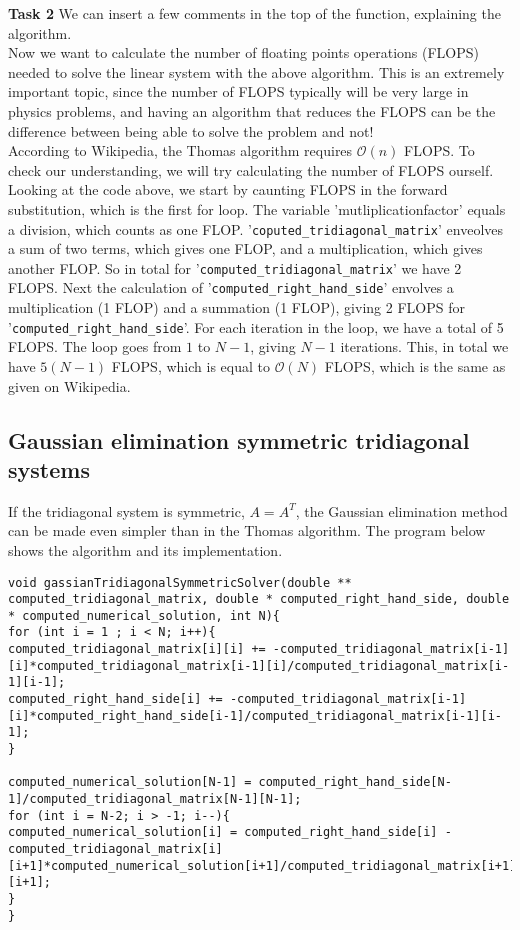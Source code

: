 \documentclass{article}
\begin{document}
\textbf{Task 2} We can insert a few comments in the top of the function, explaining the algorithm. \\

Now we want to calculate the number of floating points operations (FLOPS) needed to solve the linear system with the above algorithm. This is an extremely important topic, since the number of FLOPS typically will be very large in physics problems, and having an algorithm that reduces the FLOPS can be the difference between being able to solve the problem and not!\\

According to Wikipedia, the Thomas algorithm requires $\mathcal{O}(n)$ FLOPS. To check our understanding, we will try calculating the number of FLOPS ourself. Looking at the code above, we start by caunting FLOPS in the forward substitution, which is the first for loop. The variable 'mutliplicationfactor' equals a division, which counts as one FLOP. '\texttt{coputed\_tridiagonal\_matrix}' enveolves a sum of two terms, which gives one FLOP, and a multiplication, which gives another FLOP. So in total for '\texttt{computed\_tridiagonal\_matrix}' we have 2 FLOPS. Next the calculation of '\texttt{computed\_right\_hand\_side}' envolves a multiplication (1 FLOP) and a summation (1 FLOP), giving 2 FLOPS for '\texttt{computed\_right\_hand\_side}'. For each iteration in the loop, we have a total of 5 FLOPS. The loop goes from $1$ to $N-1$, giving $N-1$ iterations. This, in total we have $5(N-1)$ FLOPS, which is equal to $\mathcal{O}(N)$ FLOPS, which is the same as given on Wikipedia.

\subsection{Gaussian elimination symmetric tridiagonal systems}
If the tridiagonal system is symmetric, $A = A^T$, the Gaussian elimination method can be made even simpler than in the Thomas algorithm. The program below shows the algorithm and its implementation.

\begin{lstlisting}
void gassianTridiagonalSymmetricSolver(double ** computed_tridiagonal_matrix, double * computed_right_hand_side, double * computed_numerical_solution, int N){
for (int i = 1 ; i < N; i++){
computed_tridiagonal_matrix[i][i] += -computed_tridiagonal_matrix[i-1][i]*computed_tridiagonal_matrix[i-1][i]/computed_tridiagonal_matrix[i-1][i-1];
computed_right_hand_side[i] += -computed_tridiagonal_matrix[i-1][i]*computed_right_hand_side[i-1]/computed_tridiagonal_matrix[i-1][i-1];
}

computed_numerical_solution[N-1] = computed_right_hand_side[N-1]/computed_tridiagonal_matrix[N-1][N-1];
for (int i = N-2; i > -1; i--){
computed_numerical_solution[i] = computed_right_hand_side[i] - computed_tridiagonal_matrix[i][i+1]*computed_numerical_solution[i+1]/computed_tridiagonal_matrix[i+1][i+1];
}
}
\end{lstlisting}
\end{document}
